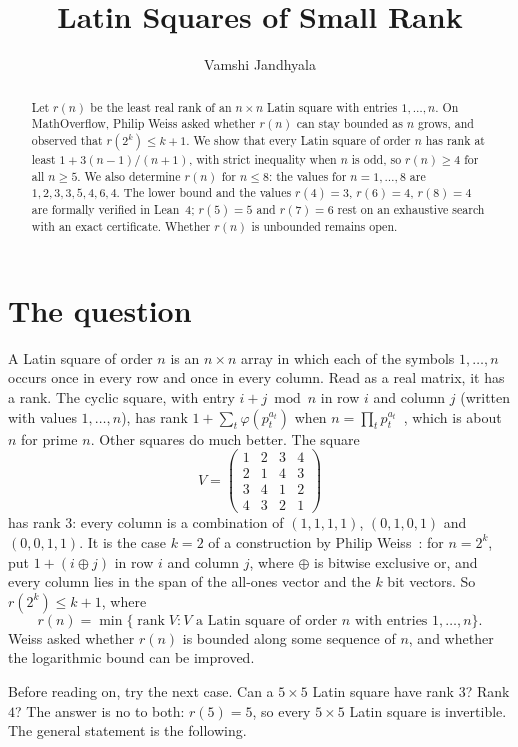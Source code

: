 \documentclass[11pt]{amsart}
\title{Latin Squares of Small Rank}
\author{Vamshi Jandhyala}
\theoremstyle{remark}
\DeclareMathOperator{\rank}{rank}
\begin{document}
\begin{abstract}
Let $r(n)$ be the least real rank of an $n\times n$ Latin square with entries $1,\dots,n$. On MathOverflow, Philip Weiss asked whether $r(n)$ can stay bounded as $n$ grows, and observed that $r(2^k)\le k+1$. We show that every Latin square of order $n$ has rank at least $1+3(n-1)/(n+1)$, with strict inequality when $n$ is odd, so $r(n)\ge4$ for all $n\ge5$. We also determine $r(n)$ for $n\le8$: the values for $n=1,\dots,8$ are $1,2,3,3,5,4,6,4$. The lower bound and the values $r(4)=3$, $r(6)=4$, $r(8)=4$ are formally verified in Lean~4; $r(5)=5$ and $r(7)=6$ rest on an exhaustive search with an exact certificate. Whether $r(n)$ is unbounded remains open.
\end{abstract}

\maketitle

\section{The question}

A Latin square of order $n$ is an $n\times n$ array in which each of the symbols $1,\dots,n$ occurs once in every row and once in every column. Read as a real matrix, it has a rank. The cyclic square, with entry $i+j \bmod n$ in row $i$ and column $j$ (written with values $1,\dots,n$), has rank $1+\sum_t\varphi(p_t^{a_t})$ when $n=\prod_t p_t^{a_t}$~\cite{SMF}, which is about $n$ for prime $n$. Other squares do much better. The square
\[
V=\begin{pmatrix}1&2&3&4\\2&1&4&3\\3&4&1&2\\4&3&2&1\end{pmatrix}
\]
has rank $3$: every column is a combination of $(1,1,1,1)$, $(0,1,0,1)$ and $(0,0,1,1)$. It is the case $k=2$ of a construction by Philip Weiss~\cite{MO}: for $n=2^k$, put $1+(i\oplus j)$ in row $i$ and column $j$, where $\oplus$ is bitwise exclusive or, and every column lies in the span of the all-ones vector and the $k$ bit vectors. So $r(2^k)\le k+1$, where
\[
r(n)=\min\{\rank V: V \text{ a Latin square of order } n \text{ with entries } 1,\dots,n\}.
\]
Weiss asked whether $r(n)$ is bounded along some sequence of $n$, and whether the logarithmic bound can be improved.

Before reading on, try the next case. Can a $5\times5$ Latin square have rank $3$? Rank $4$? The answer is no to both: $r(5)=5$, so every $5\times5$ Latin square is invertible. The general statement is the following.
\end{document}
